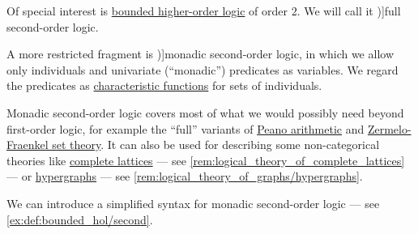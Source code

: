 \begin{definition}\label{def:second_order_logic}\mimprovised
  Of special interest is \hyperref[def:bounded_hol]{bounded higher-order logic} of order \( 2 \). We will call it \term[en=full second-order logic (\cite[277]{Hinman2005Logic})]{full second-order logic}.

  A more restricted fragment is \term[en=monadic second-order logic (\cite[def. 3.6.1]{Hinman2005Logic})]{monadic second-order logic}, in which we allow only individuals and univariate (\enquote{monadic}) predicates as variables. We regard the predicates as \hyperref[def:subset_characteristic_function]{characteristic functions} for sets of individuals.
\end{definition}
\begin{comments}
  \item Monadic second-order logic covers most of what we would possibly need beyond first-order logic, for example the \enquote{full} variants of \hyperref[def:peano_arithmetic]{Peano arithmetic} and \hyperref[def:zfc]{Zermelo-Fraenkel set theory}. It can also be used for describing some non-categorical theories like \hyperref[def:complete_lattice]{complete lattices} --- see \cref{rem:logical_theory_of_complete_lattices} --- or \hyperref[def:hypergraph]{hypergraphs} --- see \cref{rem:logical_theory_of_graphs/hypergraphs}.

  \item We can introduce a simplified syntax for monadic second-order logic --- see \cref{ex:def:bounded_hol/second}.
\end{comments}
